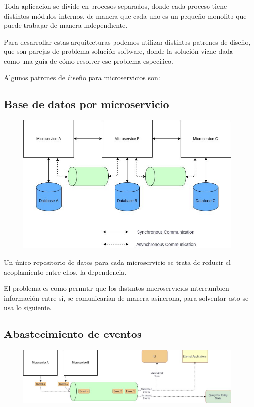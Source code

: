 \documentclass[12pt, twoside, openright]{report} %
\begin{document}
Toda aplicación se divide en procesos separados, donde cada proceso tiene distintos módulos internos, de manera que cada uno es un pequeño monolito que puede trabajar de  manera independiente.

Para desarrollar estas arquitecturas podemos utilizar distintos patrones de diseño, que son parejas de problema-solución software, donde la solución viene dada como una guía de cómo resolver ese problema específico.

Algunos patrones de diseño para microservicios son:

\subsection{Base de datos por microservicio}
\begin{figure}[H]
	{\includegraphics[scale=.3]{1_WWJQH50jxgrqh-ABFRQuzQ.jpeg}}
\end{figure}

Un único repositorio de datos para cada microservicio se trata de reducir el acoplamiento entre ellos, la dependencia.

El problema es como permitir que los distintos microservicios intercambien información entre sí, se comunicarían de manera asíncrona, para solventar esto se usa lo siguiente.

\subsection{Abastecimiento de eventos}
\begin{figure}[H]
	{\includegraphics[scale=.3]{1_tRDaroNg_GnGdCZDFxLFKQ.jpeg}}
\end{figure}
\end{document}
